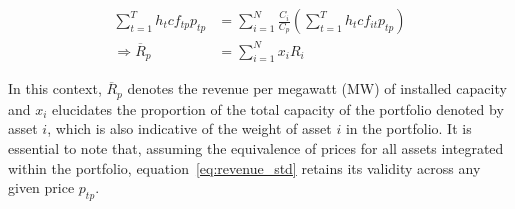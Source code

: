     \begin{align}
        \sum_{t=1}^{T} h_{t} cf_{tp} p_{tp} &=
        \sum_{i=1}^{N} \frac{C_{i}}{C_{p}} \left(  \sum_{t=1}^{T} h_{t} cf_{it} p_{tp} \right) \\
        \Rightarrow \overline{R}_{p} &= \sum_{i=1}^{N} x_{i} R_{i}
    \label{eq:revenue_std}
    \end{align}

    In this context, $\overline{R}_{p}$ denotes the revenue per megawatt (MW) of installed capacity and $x_{i}$
    elucidates the proportion of the total capacity of the portfolio denoted by asset $i$,
    which is also indicative of the weight of asset $i$ in the portfolio.
    It is essential to note that, assuming the equivalence of prices for all assets integrated within the portfolio,
    equation~\ref{eq:revenue_std} retains its validity across any given price $p_{tp}$.







